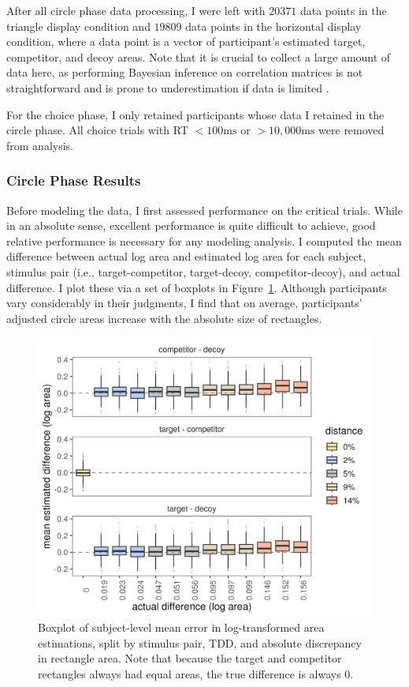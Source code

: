After all circle phase data processing, I were left with $20371$ data points in the triangle display condition and $19809$ data points in the horizontal display condition, where a data point is a vector of participant's estimated target, competitor, and decoy areas. Note that it is crucial to collect a large amount of data here, as performing Bayesian inference on correlation matrices is not straightforward and is prone to underestimation if data is limited \parencite{martin2021,merkle2023opaque}. 

For the choice phase, I only retained participants whose data I retained in the circle phase. All choice trials with RT $<100\text{ms}$ or $>10,000\text{ms}$ were removed from analysis.

\subsubsection{Circle Phase Results}
Before modeling the data, I first assessed performance on the critical trials. While in an absolute sense, excellent performance is quite difficult to achieve, good relative performance is necessary for any modeling analysis. I computed the mean difference between actual log area and estimated log area for each subject, stimulus pair (i.e., target-competitor, target-decoy, competitor-decoy), and actual difference. I plot these via a set of boxplots in Figure~\ref{fig:circle_boxplots}. Although participants vary considerably in their judgments, I find that on average, participants' adjusted circle areas increase with the absolute size of rectangles. 


\begin{figure}
   \includegraphics[width=\textwidth]{figures/circleAreaPhase_boxplot_meanlogdiffs_no_outliers.jpeg}
   \caption{Boxplot of subject-level mean error in log-transformed area estimations, split by stimulus pair, TDD, and absolute discrepancy in rectangle area. Note that because the target and competitor rectangles always had equal areas, the true difference is always 0.}
   \label{fig:circle_boxplots}
\end{figure}

